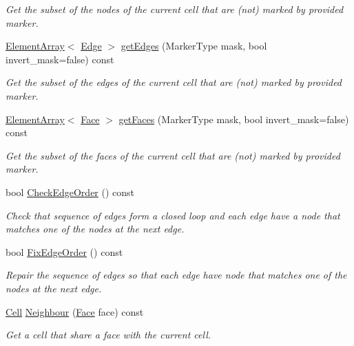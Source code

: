 \begin{DoxyCompactItemize}
\begin{DoxyCompactList}\small\item\em Get the subset of the nodes of the current cell that are (not) marked by provided marker. \end{DoxyCompactList}\item 
\hyperlink{classINMOST_1_1ElementArray}{Element\-Array}$<$ \hyperlink{classINMOST_1_1Edge}{Edge} $>$ \hyperlink{classINMOST_1_1Cell_a93e527e5b5006011c78b0cd541129660}{get\-Edges} (Marker\-Type mask, bool invert\-\_\-mask=false) const 
\begin{DoxyCompactList}\small\item\em Get the subset of the edges of the current cell that are (not) marked by provided marker. \end{DoxyCompactList}\item 
\hyperlink{classINMOST_1_1ElementArray}{Element\-Array}$<$ \hyperlink{classINMOST_1_1Face}{Face} $>$ \hyperlink{classINMOST_1_1Cell_a631a1c2f3e429ecd32f7d8c60ee5b9c0}{get\-Faces} (Marker\-Type mask, bool invert\-\_\-mask=false) const 
\begin{DoxyCompactList}\small\item\em Get the subset of the faces of the current cell that are (not) marked by provided marker. \end{DoxyCompactList}\item 
bool \hyperlink{classINMOST_1_1Cell_afc84112c4d1f84b15799ffb91615cd30}{Check\-Edge\-Order} () const 
\begin{DoxyCompactList}\small\item\em Check that sequence of edges form a closed loop and each edge have a node that matches one of the nodes at the next edge. \end{DoxyCompactList}\item 
bool \hyperlink{classINMOST_1_1Cell_a84eaa268f8c3886e1164ea14715f2419}{Fix\-Edge\-Order} () const 
\begin{DoxyCompactList}\small\item\em Repair the sequence of edges so that each edge have node that matches one of the nodes at the next edge. \end{DoxyCompactList}\item 
\hyperlink{classINMOST_1_1Cell}{Cell} \hyperlink{classINMOST_1_1Cell_ab2fb575408f3ab8b60030e8e281ea4ed}{Neighbour} (\hyperlink{classINMOST_1_1Face}{Face} face) const 
\begin{DoxyCompactList}\small\item\em Get a cell that share a face with the current cell. \end{DoxyCompactList}\item 

\end{DoxyCompactItemize}
